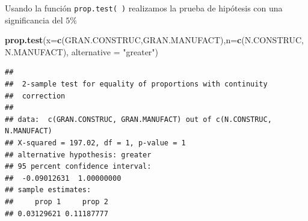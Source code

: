 \documentclass[letterpaper,]{book}
\newenvironment{Shaded}{\begin{snugshade}}{\end{snugshade}}
\newcommand{\DataTypeTok}[1]{\textcolor[rgb]{0.13,0.29,0.53}{#1}}
\newcommand{\KeywordTok}[1]{\textcolor[rgb]{0.13,0.29,0.53}{\textbf{#1}}}
\newcommand{\NormalTok}[1]{#1}
\newcommand{\OperatorTok}[1]{\textcolor[rgb]{0.81,0.36,0.00}{\textbf{#1}}}
\newcommand{\OtherTok}[1]{\textcolor[rgb]{0.56,0.35,0.01}{#1}}
\newcommand{\StringTok}[1]{\textcolor[rgb]{0.31,0.60,0.02}{#1}}
\begin{document}
\begin{Shaded}
\end{Shaded}

Usando la función \texttt{prop.test(\ )} realizamos la prueba de hipótesis con una significancia del \(5\%\)

\begin{Shaded}
\begin{Highlighting}[]
\KeywordTok{prop.test}\NormalTok{(}\DataTypeTok{x=}\KeywordTok{c}\NormalTok{(GRAN.CONSTRUC,GRAN.MANUFACT),}\DataTypeTok{n=}\KeywordTok{c}\NormalTok{(N.CONSTRUC,N.MANUFACT), }
          \DataTypeTok{alternative =} \StringTok{"greater"}\NormalTok{)}
\end{Highlighting}
\end{Shaded}

\begin{verbatim}
## 
##  2-sample test for equality of proportions with continuity
##  correction
## 
## data:  c(GRAN.CONSTRUC, GRAN.MANUFACT) out of c(N.CONSTRUC, N.MANUFACT)
## X-squared = 197.02, df = 1, p-value = 1
## alternative hypothesis: greater
## 95 percent confidence interval:
##  -0.09012631  1.00000000
## sample estimates:
##     prop 1     prop 2 
## 0.03129621 0.11187777
\end{verbatim}
\end{document}
